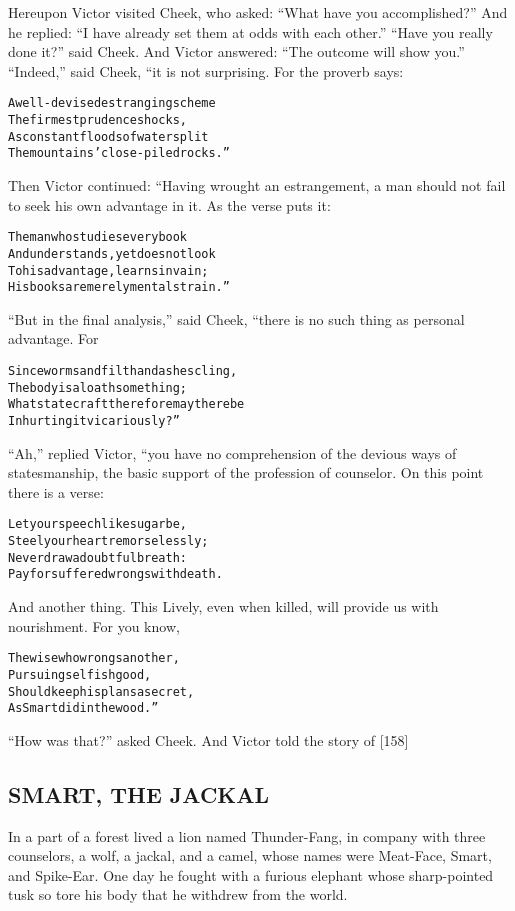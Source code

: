 \documentclass{article}
\renewenvironment{verbatim}{\begin{alltt}\normalfont\begin{centering}}{\end{centering}\end{alltt}}
\begin{document}
Hereupon Victor visited Cheek, who asked:
``What have you accomplished?'' And he replied:
``I have already set them at odds with each other.''
``Have you really done it?'' said Cheek. And Victor answered:
``The outcome will show you.'' ``Indeed,'' said Cheek, “it is not
surprising. For the proverb says:

\begin{verbatim}
A well-devised estranging scheme
    The firmest prudence shocks,
As constant floods of water split
    The mountains' close-piled rocks.”
\end{verbatim}
Then Victor continued: “Having wrought an estrangement, a man
should not fail to seek his own advantage in it. As the verse puts
it:

\begin{verbatim}
The man who studies every book
And understands, yet does not look
To his advantage, learns in vain;
His books are merely mental strain.”
\end{verbatim}
``But in the final analysis,'' said Cheek, “there is no such thing
as personal advantage. For

\begin{verbatim}
Since worms and filth and ashes cling,
The body is a loathsome thing;
What statecraft therefore may there be
In hurting it vicariously?”
\end{verbatim}
``Ah,'' replied Victor, “you have no comprehension of the devious
ways of statesmanship, the basic support of the profession of
counselor. On this point there is a verse:

\begin{verbatim}
Let your speech like sugar be,
Steel your heart remorselessly;
Never draw a doubtful breath:
Pay for suffered wrongs with death.
\end{verbatim}
And another thing. This Lively, even when killed, will provide us
with nourishment. For you know,

\begin{verbatim}
The wise who wrongs another,
    Pursuing selfish good,
Should keep his plans a secret,
    As Smart did in the wood.”
\end{verbatim}
``How was that?'' asked Cheek. And Victor told the story of [158]

\subsection{SMART, THE JACKAL}

In a part of a forest lived a lion named Thunder-Fang, in company
with three counselors, a wolf, a jackal, and a camel, whose names
were Meat-Face, Smart, and Spike-Ear. One day he fought with a
furious elephant whose sharp-pointed tusk so tore his body that he
withdrew from the world.
\end{document}
